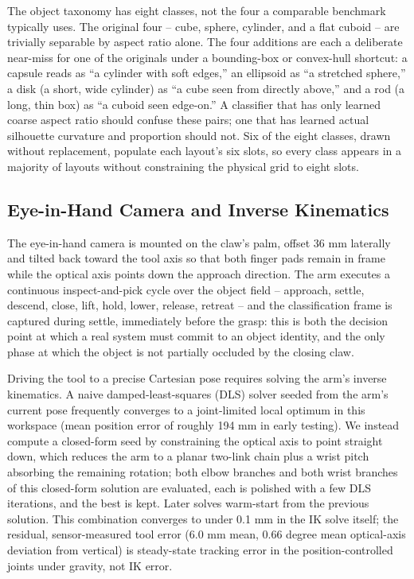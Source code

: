 \documentclass[conference]{IEEEtran}
\begin{document}
The object taxonomy has eight classes, not the four a comparable benchmark typically uses. The original four -- cube, sphere, cylinder, and a flat cuboid -- are trivially separable by aspect ratio alone. The four additions are each a deliberate near-miss for one of the originals under a bounding-box or convex-hull shortcut: a capsule reads as ``a cylinder with soft edges,'' an ellipsoid as ``a stretched sphere,'' a disk (a short, wide cylinder) as ``a cube seen from directly above,'' and a rod (a long, thin box) as ``a cuboid seen edge-on.'' A classifier that has only learned coarse aspect ratio should confuse these pairs; one that has learned actual silhouette curvature and proportion should not. Six of the eight classes, drawn without replacement, populate each layout's six slots, so every class appears in a majority of layouts without constraining the physical grid to eight slots.

\subsection{Eye-in-Hand Camera and Inverse Kinematics}

The eye-in-hand camera is mounted on the claw's palm, offset 36 mm laterally and tilted back toward the tool axis so that both finger pads remain in frame while the optical axis points down the approach direction. The arm executes a continuous inspect-and-pick cycle over the object field -- approach, settle, descend, close, lift, hold, lower, release, retreat -- and the classification frame is captured during settle, immediately before the grasp: this is both the decision point at which a real system must commit to an object identity, and the only phase at which the object is not partially occluded by the closing claw.

Driving the tool to a precise Cartesian pose requires solving the arm's inverse kinematics. A naive damped-least-squares (DLS) solver seeded from the arm's current pose frequently converges to a joint-limited local optimum in this workspace (mean position error of roughly 194 mm in early testing). We instead compute a closed-form seed by constraining the optical axis to point straight down, which reduces the arm to a planar two-link chain plus a wrist pitch absorbing the remaining rotation; both elbow branches and both wrist branches of this closed-form solution are evaluated, each is polished with a few DLS iterations, and the best is kept. Later solves warm-start from the previous solution. This combination converges to under 0.1 mm in the IK solve itself; the residual, sensor-measured tool error (6.0 mm mean, 0.66 degree mean optical-axis deviation from vertical) is steady-state tracking error in the position-controlled joints under gravity, not IK error.
\end{document}
